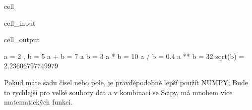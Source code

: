 \documentclass[letterpaper,10pt,english]{jupyterBook}
\begin{document}
\begin{sphinxuseclass}{cell}\begin{sphinxVerbatimInput}

\begin{sphinxuseclass}{cell_input}
\begin{sphinxVerbatim}[commandchars=\\\{\}]
  
  
   
   
   
   
   
   
 
\end{sphinxVerbatim}

\end{sphinxuseclass}\end{sphinxVerbatimInput}
\begin{sphinxVerbatimOutput}

\begin{sphinxuseclass}{cell_output}
\begin{sphinxVerbatim}[commandchars=\\\{\}]
a = 2 , b = 5
a + b = 7
a \PYGZhy{} b = \PYGZhy{}3
a * b = 10
a / b = 0.4
a ** b = 32
sqrt(b) = 2.23606797749979
\end{sphinxVerbatim}

\end{sphinxuseclass}\end{sphinxVerbatimOutput}

\end{sphinxuseclass}
\sphinxAtStartPar
Pokud máte sadu čísel nebo pole, je pravděpodobně lepší použít NUMPY; Bude to rychlejší pro velké soubory dat a v kombinaci se Scipy, má mnohem více matematických funkcí.
\end{document}

